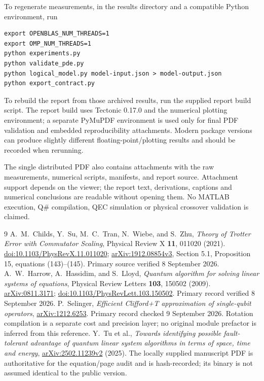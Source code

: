 \documentclass[11pt,a4paper]{article}
\begin{document}
To regenerate measurements, in the results directory and a compatible Python environment, run
\begin{verbatim}
export OPENBLAS_NUM_THREADS=1
export OMP_NUM_THREADS=1
python experiments.py
python validate_pde.py
python logical_model.py model-input.json > model-output.json
python export_contract.py
\end{verbatim}
To rebuild the report from those archived results, run the supplied report build script. The report build uses Tectonic 0.17.0 and the numerical plotting environment; a separate PyMuPDF environment is used only for final PDF validation and embedded reproducibility attachments. Modern package versions can produce slightly different floating-point/plotting results and should be recorded when rerunning.

The single distributed PDF also contains attachments with the raw measurements, numerical scripts, manifests, and report source. Attachment support depends on the viewer; the report text, derivations, captions and numerical conclusions are readable without opening them. No MATLAB execution, Q\# compilation, QEC simulation or physical crossover validation is claimed.

\begin{thebibliography}{9}
 A.~M.~Childs, Y.~Su, M.~C.~Tran, N.~Wiebe, and S.~Zhu,
\emph{Theory of Trotter Error with Commutator Scaling}, Physical Review X \textbf{11}, 011020 (2021).
\href{https://doi.org/10.1103/PhysRevX.11.011020}{doi:10.1103/PhysRevX.11.011020};
\href{https://arxiv.org/html/1912.08854v3}{arXiv:1912.08854v3}, Section 5.1, Proposition 15, equations (143)--(145). Primary source verified 8 September 2026.
 A.~W.~Harrow, A.~Hassidim, and S.~Lloyd,
\emph{Quantum algorithm for solving linear systems of equations}, Physical Review Letters \textbf{103}, 150502 (2009).
\href{https://arxiv.org/abs/0811.3171}{arXiv:0811.3171};
\href{https://doi.org/10.1103/PhysRevLett.103.150502}{doi:10.1103/PhysRevLett.103.150502}. Primary record verified 8 September 2026.
 P.~Selinger, \emph{Efficient Clifford+T approximation of single-qubit operators}, \href{https://arxiv.org/abs/1212.6253}{arXiv:1212.6253}. Primary record checked 9 September 2026. Rotation compilation is a separate cost and precision layer; no original module prefactor is inferred from this reference.
 Y.~Tu et al.,
\emph{Towards identifying possible fault-tolerant advantage of quantum linear system algorithms in terms of space, time and energy},
\href{https://arxiv.org/abs/2502.11239v2}{arXiv:2502.11239v2} (2025).
The locally supplied manuscript PDF is authoritative for the equation/page audit and is hash-recorded; its binary is not assumed identical to the public version.
\end{thebibliography}
\end{document}
